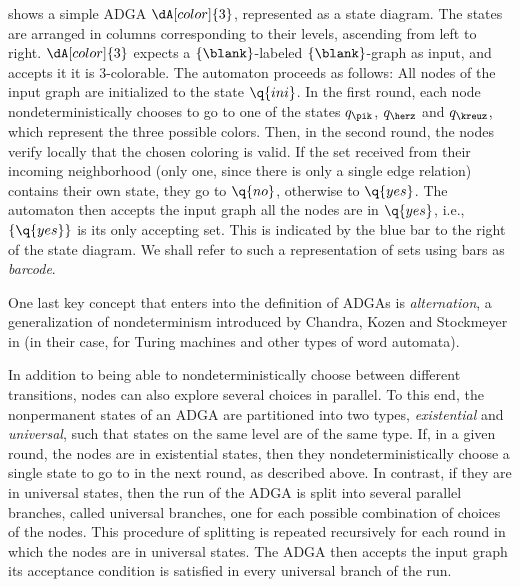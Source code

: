 \documentclass[a4paper,11pt,twoside]{report} \pdfoutput=1
\begin{document}
\begin{example*}[3-Colorability] \label{ex:ADGA_3_colorable}
   shows a simple ADGA $\dA[color]{3}$\!,
  represented as a state diagram. The states are arranged in columns
  corresponding to their levels, ascending from left to right.
  $\dA[color]{3}$ expects a $\{\blank\}$-labeled $\{\blank\}$-graph as
  input, and accepts it \Iff it is 3-colorable. The automaton proceeds
  as follows: All nodes of the input graph are initialized to the
  state $\q{ini}$. In the first round, each node nondeterministically
  chooses to go to one of the states $q_\pik$, $q_\herz$ and
  $q_\kreuz$, which represent the three possible colors. Then, in the
  second round, the nodes verify locally that the chosen coloring is
  valid. If the set received from their incoming neighborhood (only
  one, since there is only a single edge relation) contains their own
  state, they go to $\q{no}$, otherwise to $\q{yes}$. The automaton
  then accepts the input graph \Iff all the nodes are in $\q{yes}$,
  i.e., $\{\q{yes}\}$ is its only accepting set. This is indicated by
  the blue bar to the right of the state diagram. We shall refer to
  such a representation of sets using bars as \emph{barcode}.
\end{example*}

One last key concept that enters into the definition of ADGAs is
\emph{alternation}, a generalization of nondeterminism introduced by
Chandra, Kozen and Stockmeyer in \cite{CKS81} (in their case, for
Turing machines and other types of word automata).
\begin{description}[style=nextline]
\item[Alternating Automaton.] In addition to being able to
  nondeterministically choose between different transitions, nodes can
  also explore several choices in parallel. To this end, the
  nonpermanent states of an ADGA are partitioned into two types,
  \emph{existential} and \emph{universal}, such that states on the
  same level are of the same type. If, in a given round, the nodes are
  in existential states, then they nondeterministically choose a
  single state to go to in the next round, as described above. In
  contrast, if they are in universal states, then the run of the ADGA
  is split into several parallel branches, called universal branches,
  one for each possible combination of choices of the nodes. This
  procedure of splitting is repeated recursively for each round in
  which the nodes are in universal states. The ADGA then accepts the
  input graph \Iff its acceptance condition is satisfied in every
  universal branch of the run.
\end{description}
\end{document}
